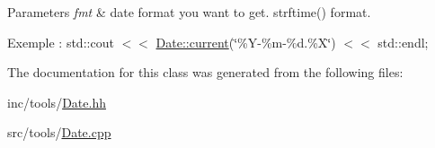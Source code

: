 \begin{DoxyParams}{Parameters}
{\em fmt} & date format you want to get. strftime() format.\\
\hline
\end{DoxyParams}
Exemple \+: std\+::cout $<$$<$ \hyperlink{classDate_a49fb653adf893d1480edd57200f77eea}{Date\+::current}(\char`\"{}\%\+Y-\/\%m-\/\%d.\%\+X\char`\"{}) $<$$<$ std\+::endl; 

The documentation for this class was generated from the following files\+:\begin{DoxyCompactItemize}
\item 
inc/tools/\hyperlink{Date_8hh}{Date.\+hh}\item 
src/tools/\hyperlink{Date_8cpp}{Date.\+cpp}\end{DoxyCompactItemize}
